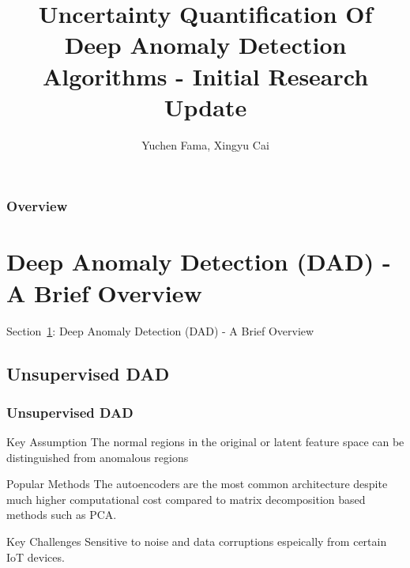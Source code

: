 \documentclass{beamer}
\title[HSB]{Uncertainty Quantification Of Deep Anomaly Detection Algorithms - Initial Research Update} %
\author[Y. Fama, X. Cai]{Yuchen Fama, Xingyu Cai} %
\institute[HSB] %
{
The Hartford Steam Boiler Inspection and Insurance Company \\%
\medskip
}
\begin{document}
\begin{frame}
\titlepage %
\end{frame}


\begin{frame}
\frametitle{Overview} %
\tiny
\tableofcontents %
\end{frame}

\section{Deep Anomaly Detection (DAD) - A Brief Overview}
\label{sec-review}
\begin{frame}
\centerline{Section~\ref{sec-review}: Deep Anomaly Detection (DAD) - A Brief Overview}
\end{frame}

\subsection{Unsupervised DAD}
\begin{frame}
\frametitle{Unsupervised DAD}
\begin{block}{Key Assumption}
The normal regions in the original or latent feature space can be distinguished from anomalous regions
\end{block}

\begin{block}{Popular Methods}
The autoencoders are the most common architecture despite much higher computational cost compared to matrix decomposition based methods such as PCA.
\end{block}

\begin{block}{Key Challenges}
Sensitive to noise and data corruptions espeically from certain IoT devices.
\end{block}
\end{frame}
\end{document}
